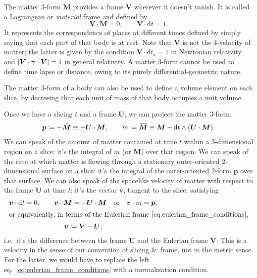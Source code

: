 \documentclass[\ifafour a4paper,12pt,\else a5paper,10pt,\fi%
onecolumn,oneside,article,%
british%
]{memoir}
\theoremstyle{remark}
\theoremstyle{innote}
\newcommand*{\citep}{\parencites}
\newcommand*{\amp}{\&}
\newcommand*{\di}{\mathrm{d}}%
\newcommand*{\defd}{\coloneqq}
\DeclarePairedDelimiter\abs{\lvert}{\rvert}
\renewcommand*{\|}{\nonscript\,\vert\nonscript\;\mathopen{}}
\newcommand*{\eqn}{eq.}%
\newcommand*{\ie}{{i.e.}}
\newcommand*{\widebar}[1]{{\mkern1.5mu\skew{2}\overline{\mkern-1.5mu#1\mkern-1.5mu}\mkern 1.5mu}}
\newcommand*{\ydd}{m}
\newcommand*{\yd}{\ydd}
\newcommand*{\yrr}{M}
\newcommand*{\yr}{\bm{\yrr}}
\newcommand*{\ytn}{t_{\textrm{a}}}
\newcommand*{\yjj}{p}
\newcommand*{\yj}{\bm{\yjj}}
\newcommand*{\yvvt}{v}
\newcommand*{\yvt}{\bm{\yvvt}}
\newcommand*{\yffg}{\gamma}
\newcommand*{\yfg}{\bm{\yffg}}
\newcommand*{\yFF}{U}
\newcommand*{\yF}{\bm{\yFF}}
\newcommand*{\ynn}{V}
\newcommand*{\yn}{\bm{\ynn}}
\begin{document}
The matter 3-form $\yr$ provides a frame $\yn$ wherever it doesn't vanish.
It is called a Lagrangean or \emph{material} frame
\citep{smarretal1978,smarretal1980} and defined by
\begin{equation}
  \label{eq:eulerian_frame_conditions}
  \yn \cdot \yr = 0, \qquad \yn \cdot \di t = 1.
\end{equation}
It represents the correspondence of places at different times defined by
simply saying that each part of that body is at rest. Note that $\yn$ is
not the 4-velocity of matter; the latter is given by the condition
$\yn\cdot \di\ytn = 1$ in Newtonian relativity and
$\abs{\yn\cdot\yfg\cdot\yn} = 1$ in general relativity. A matter 3-form
cannot be used to define time lapse or distance, owing to its purely
differential-geometric nature.

The matter 3-form of a body can also be used to define a volume element on
each slice, by decreeing that each unit of mass of that body occupies a
unit volume.

Once we have a slicing $t$ and a frame $\yF$, we can project the matter
3-form:
\begin{equation}
  \label{eq:project_matter_form}
  \yj \defd  -\Hat{\yr} \equiv -\yF\cdot\yr,
  \qquad
  \yd \defd \widebar{\yr} \equiv \yr - \di t \land (\yF\cdot\yr).
\end{equation}
We can speak of the amount of matter contained at time $t$ within a
3-dimensional region on a slice: it's the integral of $\yd$ (or $\yr$) over
that region. We can speak of the rate at which matter is flowing through a
stationary outer-oriented 2-dimensional surface on a slice: it's the
integral of the outer-oriented 2-form $\yj$ over that surface. We can also
speak of the spacelike velocity of matter with respect to the frame $\yF$
at time $t$: it's the vector $\yvt$, tangent to the slice, satisfying
\begin{subequations}
  \label{eq:matter_velocity_in_frame}
  \begin{gather}
    \yvt \cdot \di t = 0, \qquad
    \yvt \cdot \yr = - \yF \cdot \yr
    \quad\text{or}\quad
    \yvt \cdot \yd = \yj,
    \\
    \shortintertext{or equivalently, in terms of the Eulerian frame~\eqref{eq:eulerian_frame_conditions},}
    \yvt \defd \yn-\yF;
  \end{gather}
\end{subequations}
\ie\ it's the difference between the frame $\yF$ and the Eulerian frame
$\yn$. This is a velocity in the sense of our convention of slicing \amp\
frame, not in the metric sense. For the latter, we would have to replace
the left \eqn~\eqref{eq:eulerian_frame_conditions} with a normalization
condition.
\end{document}
